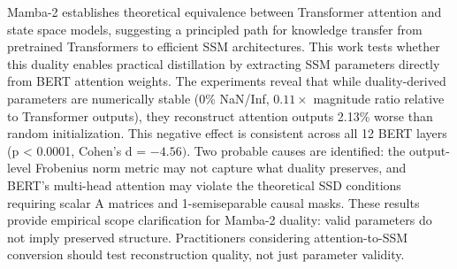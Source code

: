 
Mamba-2 establishes theoretical equivalence between Transformer attention and state space models, suggesting a principled path for knowledge transfer from pretrained Transformers to efficient SSM architectures. This work tests whether this duality enables practical distillation by extracting SSM parameters directly from BERT attention weights. The experiments reveal that while duality-derived parameters are numerically stable (0\% NaN/Inf, 0.$11\times$ magnitude ratio relative to Transformer outputs), they reconstruct attention outputs 2.13\% worse than random initialization. This negative effect is consistent across all 12 BERT layers (p < 0.0001, Cohen's d = $-4.56)$. Two probable causes are identified: the output-level Frobenius norm metric may not capture what duality preserves, and BERT's multi-head attention may violate the theoretical SSD conditions requiring scalar A matrices and 1-semiseparable causal masks. These results provide empirical scope clarification for Mamba-2 duality: valid parameters do not imply preserved structure. Practitioners considering attention-to-SSM conversion should test reconstruction quality, not just parameter validity.
